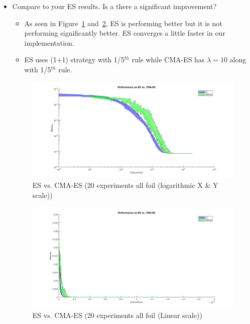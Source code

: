 \documentclass{article}
\begin{document}
\begin{itemize}
	\begin{itemize}
		\item Compare to your ES results. Is a there a significant improvement?
			\color{blue}
            \begin{itemize}
                \item As seen in Figure~\ref{fig:7} and~\ref{fig:8}, ES is performing better but it is not performing significantly better. ES converges a little faster in our implementation.
                \item ES uses (1+1) strategy with 1/5$^{th}$ rule while CMA-ES has $\lambda = 10$ along with 1/5$^{th}$ rule.
            \end{itemize}
            \color{black}
        \begin{figure}[ht!]
            \centering
            \includegraphics[width=1.0\linewidth]{es_cmaes_20exp_3foil.jpg}
            \caption{ES vs. CMA-ES (20 experiments all foil (logarithmic X \& Y scale))\label{fig:7}}
        \end{figure}
        \begin{figure}[ht!]
            \centering
            \includegraphics[width=1.0\linewidth]{es_cmaes_20exp_3foil_linear.jpg}
            \caption{ES vs. CMA-ES (20 experiments all foil (Linear scale)) \label{fig:8}}
        \end{figure}
        \newpage
	\end{itemize}


\end{itemize}
\end{document}
